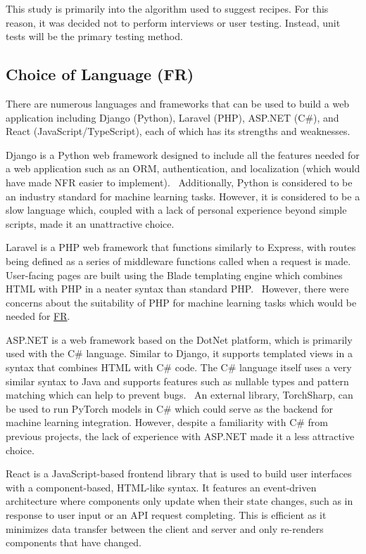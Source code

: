 This study is primarily into the algorithm used to suggest recipes. For this reason,
it was decided not to perform interviews or user testing. Instead, unit tests will
be the primary testing method.

\subsection{Choice of Language (FR)}\label{sec:language}

There are numerous languages and frameworks that can be used to build a web application including
Django (Python), Laravel (PHP), ASP.NET (C\#), and React (JavaScript/TypeScript), each of which has
its strengths and weaknesses.

Django is a Python web framework designed to include all the features needed for a web application such
as an ORM, authentication, and localization (which would have made NFR
easier to implement).~\cite{ghimire_comparative_2020} Additionally, Python is considered to be an
industry standard for machine learning tasks. However, it is considered to be a slow language\cite{srinath_pythonfastest_2017}
which, coupled with a lack of personal experience beyond simple scripts, made it an unattractive choice.

Laravel is a PHP web framework that functions similarly to Express, with routes being defined as a series of
middleware functions called when a request is made. User-facing pages are built using the Blade templating engine
which combines HTML with PHP in a neater syntax than standard PHP.~\cite{nguyen_building_2015,he_design_2015}
However, there were concerns about the suitability of PHP for machine learning tasks which would be needed for
\hyperref[req:similar_recipes]{FR}.

ASP.NET is a web framework based on the DotNet platform, which is primarily used with the C\# language.
Similar to Django, it supports templated views in a syntax that combines HTML with C\# code. The C\# language
itself uses a very similar syntax to Java and supports features such as nullable types and pattern matching
which can help to prevent bugs.~\cite{gao_type_2017} An external library, TorchSharp, can be used to run
PyTorch models in C\# which could serve as the backend for machine learning integration. However, despite
a familiarity with C\# from previous projects, the lack of experience with ASP.NET made it a less attractive
choice.

React is a JavaScript-based frontend library that is used to build user interfaces with a component-based,
HTML-like syntax. It features an event-driven architecture where components only update when their state changes,
such as in response to user input or an API request completing. This is efficient as it minimizes data transfer
between the client and server and only re-renders components that have changed.

